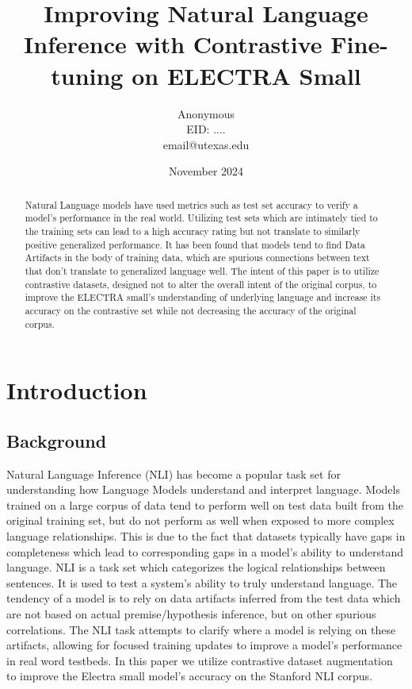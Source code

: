 \documentclass[11pt]{article}
\title{Improving Natural Language Inference with Contrastive Fine-tuning on ELECTRA Small}
\author{Anonymous \\ EID: .... \\ email@utexas.edu}
\date{November 2024}
\begin{document}
\maketitle
\begin{abstract}
Natural Language models have used metrics such as test set accuracy to verify a model's performance in the real world. Utilizing test sets which are intimately tied to the training sets can lead to a high accuracy rating but not translate to similarly positive generalized performance. It has been found that models tend to find Data Artifacts in the body of training data, which are spurious connections between text that don't translate to generalized language well. The intent of this paper is to utilize contrastive datasets, designed not to alter the overall intent of the original corpus, to improve the ELECTRA small's understanding of underlying language and increase its accuracy on the contrastive set while not decreasing the accuracy of the original corpus.
\end{abstract}

\section{Introduction}
\subsection{Background}
Natural Language Inference (NLI) has become a popular task set for understanding how Language Models understand and interpret language. Models trained on a large corpus of data tend to perform well on test data built from the original training set, but do not perform as well when exposed to more complex language relationships. This is due to the fact that datasets typically have gaps in completeness which lead to corresponding gaps in a model's ability to understand language. NLI is a task set which categorizes the logical relationships between sentences.  It is used to test a system's ability to truly understand language. The tendency of a model is to rely on data artifacts inferred from the test data which are not based on actual premise/hypothesis inference, but on other spurious correlations. The NLI task attempts to clarify where a model is relying on these artifacts, allowing for focused training updates to improve a model's performance in real word testbeds. In this paper we utilize contrastive dataset augmentation to improve the Electra small model's accuracy on the Stanford NLI corpus.
\end{document}
